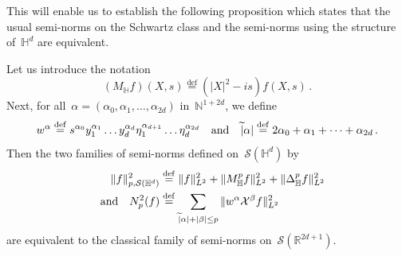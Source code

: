 \documentclass[10pt]{amsart}
\theoremstyle{definition}\newtheorem{defi}[theo]{Definition}\newtheorem{rema}[theo]{Remark}\newtheorem{exam}[theo]{Example}\newtheorem{exem}[theo]{Example}\newtheorem{nota}[theo]{Notation}
\newcommand{\D}{\Delta}
\newcommand{\wt}{\widetilde}
\newcommand*\cS{\mathcal{S}}
\newcommand*\cX{\mathcal{X}}
\newcommand*\N{\mathbb{N}}
\newcommand*\R{\mathbb{R}}
\newcommand*\bbH{\mathbb{H}}
\newcommand{\andf}{\quad\hbox{and}\quad}
\newcommand*\eqdefa{\overset{\mathrm{def}}{=}}
\begin{document}
This will enable us to establish the following proposition which states that the usual semi-norms on the Schwartz class and the semi-norms using the structure of~$\bbH^d$ are equivalent.

\begin{prop}\label{p:schwartz}
Let us introduce the notation
\[
(M_\bbH f) (X,s) \eqdefa (|X|^2- is) f(X,s)\,.
\]
Next, for all~$\alpha =(\alpha_0, \alpha_1, \dots, \alpha_{2d})$ in~$\N^{1+2d}$, we define
\[
w^\alpha \eqdefa s^{\alpha_0} y_1^{\alpha_1} \dots y_d^{\alpha_d} \eta_1^{\alpha_{d+1}} \dots \eta_d^{\alpha_{2d}}
\andf \wt |\alpha|\eqdefa 2\alpha_0+\alpha_1+\dots +\alpha_{2d}\,.
\]
Then the two families of semi-norms defined on~$\cS(\bbH^d)$ by
\[
\begin{aligned}
\|f\|^2_{p,\cS(\bbH^d)} & \eqdefa \|f\|_{L^2} ^2+ \|M_\bbH^pf\|_{L^2}^2 +\| \D_\bbH^p f \|^2_{L^2} \\ \andf
N_p^2(f) & \eqdefa \sum_{\wt |\alpha|+|\beta| \leq p }\| w^\alpha \cX^\beta f\|^2_{L^2}
\end{aligned}
\]
are equivalent to the classical family of semi-norms on~$\cS(\R^{2d+1})$.
\end{prop}
\end{document}

